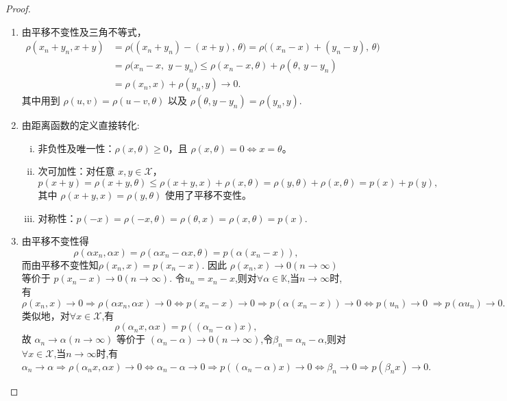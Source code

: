 \documentclass[../../main.tex]{subfiles}%
\begin{document}
\begin{proof}
\begin{enumerate}[(1)]
\item 由平移不变性及三角不等式，
\begin{align*}
\rho(x_n+y_n,x+y)
&=\rho\bigl((x_n+y_n)-(x+y),\,\theta\bigr)
=\rho\bigl((x_n-x)+(y_n-y),\,\theta\bigr)\\
&=\rho\bigl(x_n-x,\;y-y_n\bigr)\leqslant \rho(x_n-x,\theta)+\rho(\theta,\,y-y_n)\\
&=\rho(x_n,x)+\rho(y_n,y)\to0.
\end{align*}
其中用到 $\rho(u,v)=\rho(u-v,\theta)$ 以及 $\rho(\theta,y-y_n)=\rho(y_n,y)$.

\item 由距离函数的定义直接转化:
\begin{enumerate}[(i)]
\item 非负性及唯一性：$\rho(x,\theta)\geqslant 0$，且 $\rho(x,\theta)=0\iff x=\theta$。

\item 次可加性：对任意 $x,y\in\mathscr{X}$，
\[
p(x+y)=\rho(x+y,\theta)\leqslant \rho(x+y,x)+\rho(x,\theta)=\rho(y,\theta)+\rho(x,\theta)=p(x)+p(y),
\]
其中 $\rho(x+y,x)=\rho(y,\theta)$ 使用了平移不变性。

\item 对称性：$p(-x)=\rho(-x,\theta)=\rho(\theta,x)=\rho(x,\theta)=p(x)$.
\end{enumerate}

\item 由平移不变性得
\[
\rho(\alpha x_n,\alpha x)=\rho(\alpha x_n-\alpha x,\theta)=p(\alpha(x_n-x)),
\]
而由平移不变性知$\rho(x_n,x)=p(x_n-x)$. 因此 $\rho(x_n,x)\to0(n\to \infty)$ 等价于 $p(x_n-x)\to0(n\to \infty)$. 令$u_n=x_n-x$,则对$\forall \alpha \in \mathbb{K}$,当$n\to \infty$时,有
\[
\rho (x_n,x)\rightarrow 0\Longrightarrow \rho (\alpha x_n,\alpha x)\rightarrow 0\Longleftrightarrow p\left( x_n-x \right) \rightarrow 0\Longrightarrow p\left( \alpha \left( x_n-x \right) \right) \rightarrow 0\Longleftrightarrow p\left( u_n \right) \rightarrow 0\;\Longrightarrow p\left( \alpha u_n \right) \rightarrow 0.
\]
类似地，对$\forall x\in \mathscr{X}$,有
\[
\rho(\alpha_n x,\alpha x)=p((\alpha_n-\alpha)x),
\]
故 $\alpha_n\to\alpha(n\to \infty)$ 等价于 $(\alpha_n-\alpha)\to0(n\to \infty)$,令$\beta_n=\alpha_n-\alpha$,则对$\forall x\in \mathscr{X}$,当$n\to \infty$时,有
\[
\alpha _n\rightarrow \alpha \Longrightarrow \rho (\alpha _nx,\alpha x)\rightarrow 0\Longleftrightarrow \alpha _n-\alpha \rightarrow 0\Longrightarrow p(\left( \alpha _n-\alpha \right) x)\rightarrow 0\Longleftrightarrow \beta _n\rightarrow 0\Longrightarrow p(\beta _nx)\rightarrow 0.
\]
\end{enumerate}
\end{proof}
\end{document}
